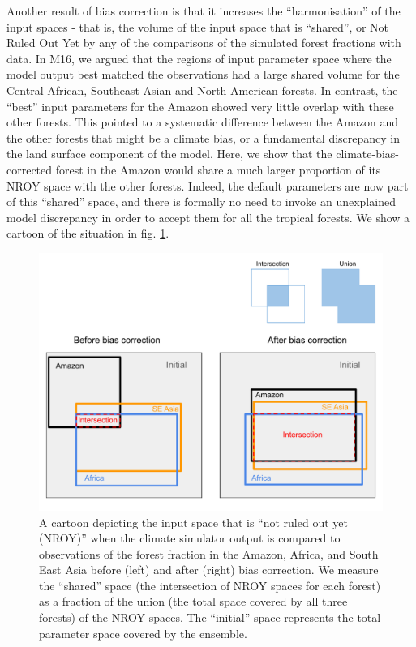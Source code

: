 \documentclass[gmd, manuscript]{copernicus}
\begin{document}
Another result of bias correction is that it increases the ``harmonisation'' of the input spaces - that is, the volume of the input space that is ``shared'', or Not Ruled Out Yet by any of the comparisons of the simulated forest fractions with data. In M16, we argued that the regions of input parameter space where the model output best matched the observations had a large shared volume for the Central African, Southeast Asian and North American forests. In contrast, the ``best'' input parameters for the Amazon showed very little overlap with these other forests. This pointed to a systematic difference between the Amazon and the other forests that might be a climate bias, or a fundamental discrepancy in the land surface component of the model. Here, we show that the climate-bias-corrected forest in the Amazon would share a much larger proportion of its NROY space with the other forests. Indeed, the default parameters are now part of this ``shared'' space, and there is formally no need to invoke an unexplained model discrepancy in order to accept them for all the tropical forests. We show a cartoon of the situation in fig. \ref{fig:NROY_cartoon}.

\begin{figure}[t]
\includegraphics[width=12cm]{../graphics/NROY_cartoon.pdf}
\caption{A cartoon depicting the input space that is ``not ruled out yet (NROY)'' when the climate simulator output is compared to observations of the forest fraction in the Amazon, Africa, and South East Asia before (left) and after (right) bias correction. We measure the ``shared'' space (the intersection of NROY spaces for each forest) as a fraction of the union (the total space covered by all three forests) of the NROY spaces. The ``initial'' space represents the total parameter space covered by the ensemble.
}
\label{fig:NROY_cartoon}
\end{figure}
\end{document}
